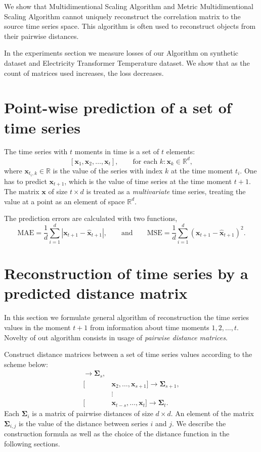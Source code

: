 \documentclass[12pt]{article}
\begin{document}
	We show that Multidimentional Scaling Algorithm \cite{MDS} and Metric Multidimentional Scaling Algorithm \cite{inbook} cannot uniquely reconstruct the correlation matrix to the source time series space. This algorithm is often used to reconstruct objects from their pairwise distances.
	
	In the experiments section we measure losses of our Algorithm on synthetic dataset and Electricity Transformer Temperature dataset. We show that as the count of matrices used increases, the loss decreases.

\section{Point-wise prediction of a set of time series}

The time series with $t$ moments in time is a set of $t$ elements:
\[
[\mathbf{x}_1, \mathbf{x}_2, \ldots, \mathbf{x}_t],\qquad \text{for each } k: \mathbf{x}_k \in \mathbb{R}^d,
\]
where $\mathbf{x}_{t_i, k} \in \mathbb{R}$ is the value of the series with index $k$ at the time moment $t_i$.
One has to predict $\mathbf{x}_{t+1}$, which is the value of time series at the time moment $t+1$. The matrix $\mathbf{x}$ of size $t \times d$ is treated as a \emph{multivariate} time series, treating the value at a point as an element of space $\mathbb{R}^d$.

The prediction errors are calculated with two functions,
\[
\text{MAE} = \frac{1}{d}{\sum_{i=1}^{d} |\mathbf{x}_{t+1} - \mathbf{\hat{x}}_{t+1}|}, 
\qquad \text{and} \qquad 
\text{MSE} = \frac{1}{d}{\sum_{i=1}^{d} (\mathbf{x}_{t+1} - \mathbf{\hat{x}}_{t+1})^2}. \tag{*} \label{loss}
\]

\section{Reconstruction of time series by a predicted distance matrix}

In this section we formulate general algorithm of reconstruction the time series values in the moment $t+1$ from information about time moments $1, 2, \ldots, t$. Novelty of out algorithm consists in usage of \emph{pairwise distance matrices}.

Construct distance matrices between a set of time series values according to the scheme below:
\begin{align*}
	[&\mathbf{x}_1, \ldots, \mathbf{x}_s] \rightarrow \mathbf{\Sigma}_s, \\
	[&\mathbf{x}_2, \ldots, \mathbf{x}_{s+1}] \rightarrow \mathbf{\Sigma}_{s+1}, \\
	&\vdots \\
	[&\mathbf{x}_{t-s}, \ldots, \mathbf{x}_t] \rightarrow \mathbf{\Sigma}_{t}.
\end{align*}
Each $\mathbf{\Sigma}_i$ is a matrix of pairwise distances of size $d \times d$. An element of the matrix $\mathbf{\Sigma}_{i,j}$ is the value of the distance between series $i$ and $j$. We describe the construction formula as well as the choice of the distance function in the following sections.
\end{document}
